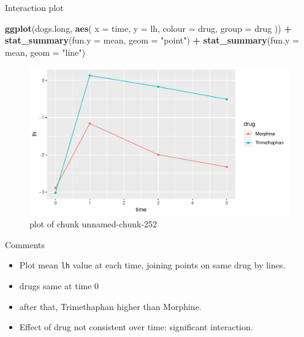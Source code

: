 \documentclass[ignorenonframetext,]{beamer}
\newenvironment{Shaded}{\begin{snugshade}}{\end{snugshade}}
\newcommand{\DataTypeTok}[1]{\textcolor[rgb]{0.13,0.29,0.53}{#1}}
\newcommand{\KeywordTok}[1]{\textcolor[rgb]{0.13,0.29,0.53}{\textbf{#1}}}
\newcommand{\NormalTok}[1]{#1}
\newcommand{\OperatorTok}[1]{\textcolor[rgb]{0.81,0.36,0.00}{\textbf{#1}}}
\newcommand{\StringTok}[1]{\textcolor[rgb]{0.31,0.60,0.02}{#1}}
\begin{document}
\begin{frame}[fragile]{Interaction plot}
\protect\hypertarget{interaction-plot-3}{}

\begin{Shaded}
\begin{Highlighting}[]
\KeywordTok{ggplot}\NormalTok{(dogs.long, }\KeywordTok{aes}\NormalTok{(}
  \DataTypeTok{x =}\NormalTok{ time, }\DataTypeTok{y =}\NormalTok{ lh,}
  \DataTypeTok{colour =}\NormalTok{ drug, }\DataTypeTok{group =}\NormalTok{ drug}
\NormalTok{)) }\OperatorTok{+}
\StringTok{  }\KeywordTok{stat_summary}\NormalTok{(}\DataTypeTok{fun.y =}\NormalTok{ mean, }\DataTypeTok{geom =} \StringTok{"point"}\NormalTok{) }\OperatorTok{+}
\StringTok{  }\KeywordTok{stat_summary}\NormalTok{(}\DataTypeTok{fun.y =}\NormalTok{ mean, }\DataTypeTok{geom =} \StringTok{"line"}\NormalTok{)}
\end{Highlighting}
\end{Shaded}

\begin{figure}
\centering
\includegraphics{figure/unnamed-chunk-252-1.pdf}
\caption{plot of chunk unnamed-chunk-252}
\end{figure}

\end{frame}

\begin{frame}[fragile]{Comments}
\protect\hypertarget{comments-18}{}

\begin{itemize}
\item
  Plot mean \texttt{lh} value at each time, joining points on same drug
  by lines.
\item
  drugs same at time 0
\item
  after that, Trimethaphan higher than Morphine.
\item
  Effect of drug not consistent over time: significant interaction.
\end{itemize}

\end{frame}
\end{document}

